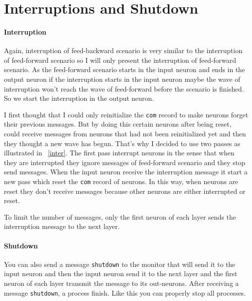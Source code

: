 \documentclass[12pt]{article}
\begin{document}
\section{Interruptions and Shutdown}

\paragraph{Interruption}
Again, interruption of feed-backward scenario is very similar to the interruption of feed-forward scenario so I will only present the interruption of feed-forward scenario. As the feed-forward scenario starts in the input neuron and ends in the output neuron if the interruption starts in the input neuron maybe the wave of interruption won't reach the wave of feed-forward before the scenario is finished. So we start the interruption in the output neuron.

I first thought that I could only reinitialize the \verb|com| record to make neurons forget their previous messages. But by doing this certain neurons after being reset, could receive messages from neurons that had not been reinitialized yet and then they thought a new wave has begun. That's why I decided to use two passes as illustrated in \figurename~\ref{inter}. The first pass interrupt neurons in the sense that when they are interrupted they ignore messages of feed-forward scenario and they stop send messages. When the input neuron receive the interruption message it start a new pass which reset the \verb|com| record of neurons. In this way, when neurons are reset they don't receive messages because other neurons are either interrupted or reset.

To limit the number of messages, only the first neuron of each layer sends the interruption message to the next layer.

\paragraph{Shutdown}
You can also send a message \verb|shutdown| to the monitor that will send it to the input neuron and then the input neuron send it to the next layer and the first neuron of each layer transmit the message to its out-neurons. After receiving a message \verb|shutdown|, a process finish. Like this you can properly stop all processes.
\end{document}

